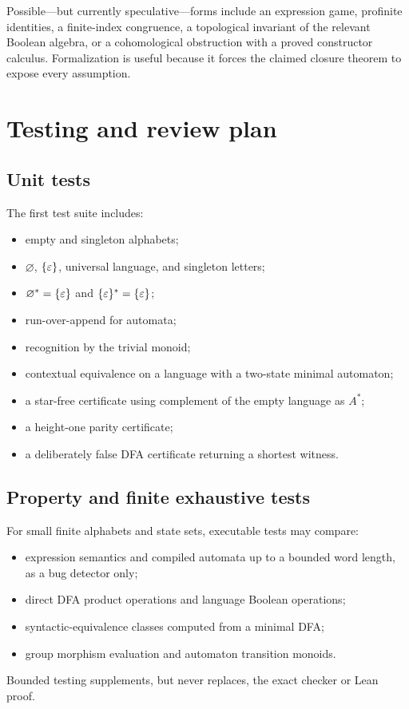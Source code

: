 \documentclass{amsart}
\begin{document}
Possible---but currently speculative---forms include an expression game, profinite identities, a finite-index congruence, a topological invariant of the relevant Boolean algebra, or a cohomological obstruction with a proved constructor calculus.  Formalization is useful because it forces the claimed closure theorem to expose every assumption.

\section{Testing and review plan}

\subsection{Unit tests}

The first test suite includes:
\begin{itemize}
  \item empty and singleton alphabets;
  \item $\varnothing$, $\{\varepsilon\}$, universal language, and singleton letters;
  \item $\varnothing^\ast=\{\varepsilon\}$ and $\{\varepsilon\}^\ast=\{\varepsilon\}$;
  \item run-over-append for automata;
  \item recognition by the trivial monoid;
  \item contextual equivalence on a language with a two-state minimal automaton;
  \item a star-free certificate using complement of the empty language as $A^\ast$;
  \item a height-one parity certificate;
  \item a deliberately false DFA certificate returning a shortest witness.
\end{itemize}

\subsection{Property and finite exhaustive tests}

For small finite alphabets and state sets, executable tests may compare:
\begin{itemize}
  \item expression semantics and compiled automata up to a bounded word length, as a bug detector only;
  \item direct DFA product operations and language Boolean operations;
  \item syntactic-equivalence classes computed from a minimal DFA;
  \item group morphism evaluation and automaton transition monoids.
\end{itemize}
Bounded testing supplements, but never replaces, the exact checker or Lean proof.
\end{document}
